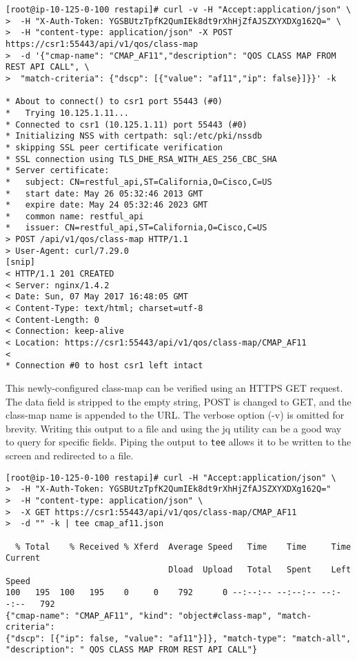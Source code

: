 \begin{verbatim}
[root@ip-10-125-0-100 restapi]# curl -v -H "Accept:application/json" \
>  -H "X-Auth-Token: YGSBUtzTpfK2QumIEk8dt9rXhHjZfAJSZXYXDXg162Q=" \
>  -H "content-type: application/json" -X POST https://csr1:55443/api/v1/qos/class-map
>  -d '{"cmap-name": "CMAP_AF11","description": "QOS CLASS MAP FROM REST API CALL", \
>  "match-criteria": {"dscp": [{"value": "af11","ip": false}]}}' -k

* About to connect() to csr1 port 55443 (#0)
*   Trying 10.125.1.11...
* Connected to csr1 (10.125.1.11) port 55443 (#0)
* Initializing NSS with certpath: sql:/etc/pki/nssdb
* skipping SSL peer certificate verification
* SSL connection using TLS_DHE_RSA_WITH_AES_256_CBC_SHA
* Server certificate:
* 	subject: CN=restful_api,ST=California,O=Cisco,C=US
* 	start date: May 26 05:32:46 2013 GMT
* 	expire date: May 24 05:32:46 2023 GMT
* 	common name: restful_api
* 	issuer: CN=restful_api,ST=California,O=Cisco,C=US
> POST /api/v1/qos/class-map HTTP/1.1
> User-Agent: curl/7.29.0
[snip]
< HTTP/1.1 201 CREATED
< Server: nginx/1.4.2
< Date: Sun, 07 May 2017 16:48:05 GMT
< Content-Type: text/html; charset=utf-8
< Content-Length: 0
< Connection: keep-alive
< Location: https://csr1:55443/api/v1/qos/class-map/CMAP_AF11
< 
* Connection #0 to host csr1 left intact
\end{verbatim}

This newly-configured class-map can be verified using an HTTPS GET request.
The data field is stripped to the empty string, POST is changed to GET, and
the class-map name is appended to the URL\@. The verbose option (-v) is omitted
for brevity. Writing this output to a file and using the jq utility can be a
good way to query for specific fields. Piping the output to \verb|tee| allows
it to be written to the screen and redirected to a file.

\begin{verbatim}
[root@ip-10-125-0-100 restapi]# curl -H "Accept:application/json" \
>  -H "X-Auth-Token: YGSBUtzTpfK2QumIEk8dt9rXhHjZfAJSZXYXDXg162Q="
>  -H "content-type: application/json" \
>  -X GET https://csr1:55443/api/v1/qos/class-map/CMAP_AF11
>  -d "" -k | tee cmap_af11.json

  % Total    % Received % Xferd  Average Speed   Time    Time     Time  Current
                                 Dload  Upload   Total   Spent    Left  Speed
100   195  100   195    0     0    792      0 --:--:-- --:--:-- --:--:--   792
{"cmap-name": "CMAP_AF11", "kind": "object#class-map", "match-criteria":
{"dscp": [{"ip": false, "value": "af11"}]}, "match-type": "match-all",
"description": " QOS CLASS MAP FROM REST API CALL"}
\end{verbatim}

